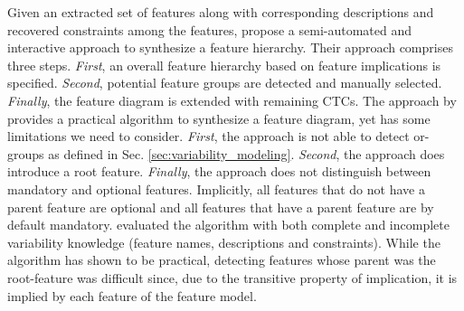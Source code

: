 Given an extracted set of features along with corresponding descriptions and
recovered constraints among the features, \cite{she_reverse_2011} propose a
semi-automated and interactive approach to synthesize a feature hierarchy.
Their approach comprises three steps. \emph{First}, an overall feature hierarchy
based on feature implications is specified. \emph{Second}, potential feature
groups are detected and manually selected. \emph{Finally}, the feature diagram
is extended with remaining CTCs. 
The approach by \cite{she_reverse_2011} provides a practical algorithm to synthesize a
feature diagram, yet has some limitations we need to consider. \emph{First}, the
approach is not able to detect or-groups as defined in Sec. \ref{sec:variability_modeling}.
\emph{Second}, the approach does introduce a root feature. \emph{Finally}, the
approach does not distinguish between mandatory and optional features. Implicitly, all features
that do not have a parent feature are optional and all features that have a
parent feature are by default mandatory. \cite{she_reverse_2011} evaluated the
algorithm with both complete and incomplete variability knowledge (feature
names, descriptions and constraints). While the algorithm has shown to be
practical, detecting features whose parent was the root-feature was difficult
since, due to the transitive property of implication, it is implied by each
feature of the feature model.\\

%   

